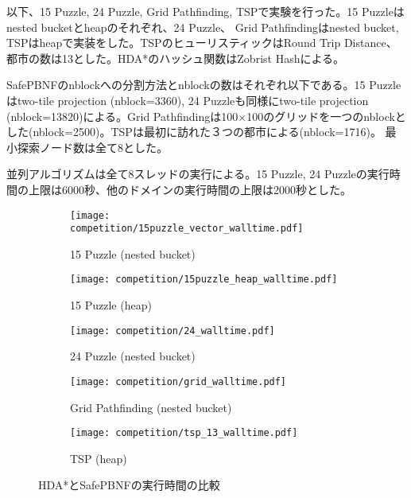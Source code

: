 \documentclass[uplatex]{jsarticle}
\begin{document}
以下、15 Puzzle, 24 Puzzle, Grid Pathfinding, TSPで実験を行った。15 Puzzleはnested bucketとheapのそれぞれ、24 Puzzle、 Grid Pathfindingはnested bucket, TSPはheapで実装をした。TSPのヒューリスティックはRound Trip Distance、都市の数は13とした。HDA*のハッシュ関数はZobrist Hashによる。

SafePBNFのnblockへの分割方法とnblockの数はそれぞれ以下である。15 Puzzleはtwo-tile projection (nblock=3360), 24 Puzzleも同様にtwo-tile projection (nblock=13820)による。Grid Pathfindingは100$\times$100のグリッドを一つのnblockとした(nblock=2500)。TSPは最初に訪れた３つの都市による(nblock=1716)。 %
最小探索ノード数は全て8とした。

並列アルゴリズムは全て8スレッドの実行による。15 Puzzle, 24 Puzzleの実行時間の上限は6000秒、他のドメインの実行時間の上限は2000秒とした。
\newline

\begin{figure}[h]
	\centering
	\begin{subfigure}{0.4\columnwidth}
		\texttt{[image: competition/15puzzle\_vector\_walltime.pdf]}
		\caption{15 Puzzle (nested bucket)}
		\label{fig:15puzzle_vector}
	\end{subfigure}
	\begin{subfigure}{0.4\columnwidth}
		\texttt{[image: competition/15puzzle\_heap\_walltime.pdf]}
		\caption{15 Puzzle (heap)}
		\label{fig:15puzzle_heap}
	\end{subfigure}
	\begin{subfigure}{0.4\columnwidth}
		\texttt{[image: competition/24\_walltime.pdf]}
		\caption{24 Puzzle (nested bucket)}
		\label{fig:24puzzle_vector}
	\end{subfigure}
	\begin{subfigure}{0.4\columnwidth}
		\texttt{[image: competition/grid\_walltime.pdf]}
		\caption{Grid Pathfinding (nested bucket)}
		\label{fig:grid}
	\end{subfigure}
	\begin{subfigure}{0.4\columnwidth}
		\texttt{[image: competition/tsp\_13\_walltime.pdf]}
		\caption{TSP (heap)} %
		\label{fig:tsp_13}
	\end{subfigure}
	\caption{HDA*とSafePBNFの実行時間の比較}
	\label{fig:comparison}
\end{figure}
\end{document}
